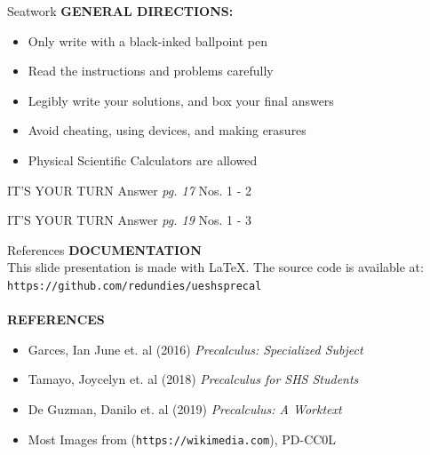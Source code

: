 \documentclass[14pt,aspectratio=169]{beamer}
\begin{document}
\begin{frame}{Seatwork}
\textbf{GENERAL DIRECTIONS:}
\begin{itemize}
 \item Only write with a black-inked ballpoint pen
 \item Read the instructions and problems carefully
 \item Legibly write your solutions, and box your final answers
 \item Avoid cheating, using devices, and making erasures
 \item Physical Scientific Calculators are allowed
\end{itemize}

 \begin{block}{IT'S YOUR TURN}
    Answer \emph{pg. 17} Nos. 1 - 2
 \end{block}

 \begin{block}{IT'S YOUR TURN}
  Answer \emph{pg. 19} Nos. 1 - 3
 \end{block}


\end{frame}







\begin{frame}{References}
\textbf{DOCUMENTATION}\\
 This slide presentation is made with {\textrm \LaTeX}.
 The source code is available at:
 \texttt{https://github.com/redundies/ueshsprecal}\\~\\

 \textbf{REFERENCES}
 \begin{itemize}
  \item Garces, Ian June et. al (2016) \textit{Precalculus: Specialized Subject}
  \item Tamayo, Joycelyn et. al (2018) \textit{Precalculus for SHS Students}
  \item De Guzman, Danilo et. al (2019) \textit{Precalculus: A Worktext}
  \item Most Images from (\texttt{https://wikimedia.com}), {\sc PD-CC0L}
 \end{itemize}


\end{frame}
\end{document}
